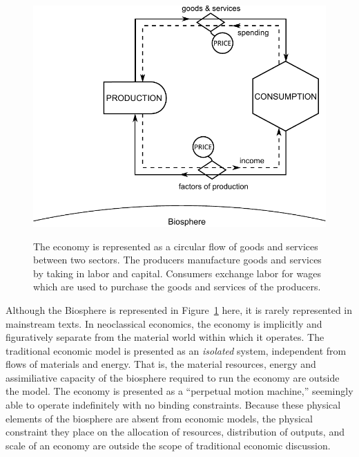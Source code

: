 \begin{figure}[!ht]
\label{fig:perp_motion_1}
\centering\
\includegraphics[width=\linewidth]{Part_0/Chapter_Introduction/images/Perpetual_motion_1.pdf}
\caption[The traditional economic model of the economy]{The economy 
is represented as a circular flow of goods and services between two sectors. 
The producers manufacture goods and services 
by taking in labor and capital. 
Consumers exchange labor for wages 
which are used to purchase 
the goods and services of the producers.}
\end{figure}

Although the Biosphere is represented in
Figure~\ref{fig:perp_motion_1} 
here, it is rarely represented in mainstream texts. 
In neoclassical economics, 
the economy is implicitly and figuratively separate from the material world within which it operates.
The traditional economic model is presented as an \emph{isolated} system, 
independent from flows of materials and energy.
That is, the material resources, energy
and assimiliative capacity of the biosphere required to run the economy are outside the model.
The economy is presented as a ``perpetual motion machine,'' seemingly able to %
operate indefinitely with no binding constraints.
Because these physical elements of the biosphere are absent from economic models,
the physical constraint they place on the allocation of resources, distribution of outputs, and 
scale of an economy are outside the scope of traditional economic discussion.

